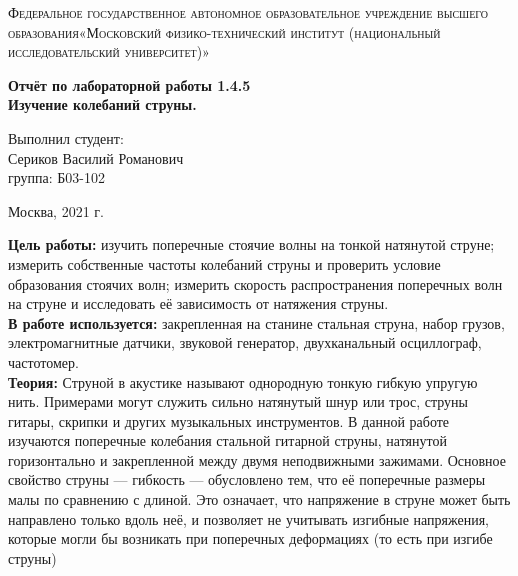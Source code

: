 \documentclass[a4paper, 12pt]{article}%
\begin{document}
	\begin{titlepage}
		\begin{center}
			\textsc{Федеральное государственное автономное образовательное учреждение высшего образования«Московский физико-технический институт (национальный исследовательский университет)»\\[5mm]
			}
			
			\vfill
			
			\textbf{Отчёт по лабораторной работы 1.4.5\\[3mm]
				Изучение колебаний струны.
				\\[50mm]
			}
			
		\end{center}
		
		\hfill
		\begin{minipage}{.5\textwidth}
			Выполнил студент:\\[2mm]
			Сериков Василий Романович\\[2mm]
			группа: Б03-102\\[5mm]
			
		\end{minipage}
		\vfill
		\begin{center}
			Москва, 2021 г.
		\end{center}
		
	\end{titlepage}
	
	\newpage
	\textbf{Цель работы:} изучить поперечные стоячие волны на тонкой натянутой струне;
	измерить собственные частоты колебаний струны и проверить условие образования
	стоячих волн; измерить скорость распространения поперечных волн на струне и исследовать её зависимость от натяжения струны. \\
	
	\textbf{В работе используется:} закрепленная на станине стальная струна, набор грузов, электромагнитные датчики, звуковой генератор, двухканальный осциллограф,
	частотомер. \\
	
	\textbf{Теория:} Струной в акустике называют однородную тонкую гибкую упругую
	нить. Примерами могут служить сильно натянутый шнур или трос, струны
	гитары, скрипки и других музыкальных инструментов. В данной работе
	изучаются поперечные колебания стальной гитарной струны, натянутой горизонтально и закрепленной между двумя неподвижными зажимами.
	Основное свойство струны — гибкость — обусловлено тем, что её поперечные размеры малы по сравнению с длиной. Это означает, что напряжение в струне может быть направлено только вдоль неё, и позволяет не
	учитывать изгибные напряжения, которые могли бы возникать при поперечных деформациях (то есть при изгибе струны)\\
	
\end{document}
